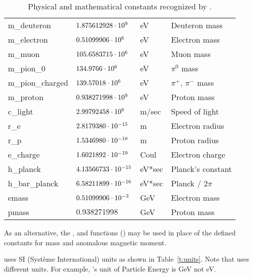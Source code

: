 \begin{table}[h]
\begin{tabular}{llll}
  m_deuteron            & $1.875612928 \cdot 10^{9}$  & eV         & Deuteron mass         \\  
  m_electron            & $0.51099906 \cdot 10^{6}$   & eV         & Electron mass         \\
  m_muon                & $105.6583715 \cdot 10^{6}$  & eV         & Muon mass             \\
  m_pion_0              & $134.9766 \cdot 10^{6}$     & eV         & $\pi^0$ mass          \\
  m_pion_charged        & $139.57018 \cdot 10^{6}$    & eV         & $\pi^+$, $\pi^-$ mass \\
  m_proton              & $0.938271998 \cdot 10^{9}$  & eV         & Proton mass           \\
  c_light               & $2.99792458 \cdot 10^{8}$   & m/sec      & Speed of light        \\
  r_e                   & $2.8179380 \cdot 10^{-15}$  & m          & Electron radius       \\
  r_p                   & $1.5346980 \cdot 10^{-18}$  & m          & Proton radius         \\
  e_charge              & $1.6021892 \cdot 10^{-19}$  & Coul       & Electron charge       \\
  h_planck              & $4.13566733 \cdot 10^{-15}$ & eV*sec     & Planck's constant     \\
  h_bar_planck          & $6.58211899 \cdot 10^{-16}$ & eV*sec     & Planck / $2\pi$       \\
  emass                 & $0.51099906 \cdot 10^{-3}$  & GeV        & Electron mass         \\
  pmass                 & $0.938271998$          & GeV        & Proton mass           \\ \bottomrule
\end{tabular}
\caption{Physical and mathematical constants recognized by \bmad.}
\label{t:constants}
\end{table}

As an alternative, the , and  functions
() may be used in place of the defined constants for mass and anomalous
magnetic moment.

\newpage

\bmad uses SI (Syst\`eme International) units as shown in
Table~\ref{t:units}.  Note that \mad uses different units. For example,
\mad's unit of Particle Energy is GeV not eV.

